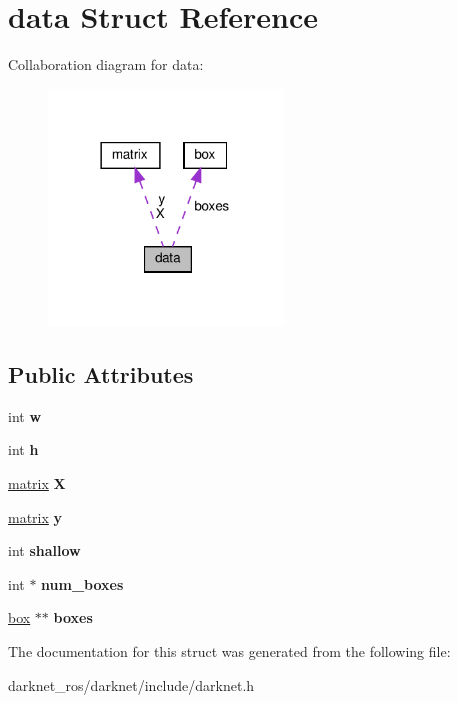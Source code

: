 \hypertarget{structdata}{}\section{data Struct Reference}
\label{structdata}


Collaboration diagram for data\+:
\nopagebreak
\begin{figure}[H]
\begin{center}
\leavevmode
\includegraphics[width=177pt]{structdata__coll__graph}
\end{center}
\end{figure}
\subsection*{Public Attributes}
\begin{DoxyCompactItemize}
\item 
\mbox{\label{structdata_a9de96028e1598b323d91ffb059cd48b2}} 
int {\bfseries w}
\item 
\mbox{\label{structdata_adbac4a041922ac9e6c47953f5fa23126}} 
int {\bfseries h}
\item 
\mbox{\label{structdata_a1f37ae26b26b12ef5c70a12957826e87}} 
\hyperlink{structmatrix}{matrix} {\bfseries X}
\item 
\mbox{\label{structdata_a30946bde3a05e40df6fbb49c5dd9b627}} 
\hyperlink{structmatrix}{matrix} {\bfseries y}
\item 
\mbox{\label{structdata_a3ef4c4e942b1f2b6a5e64e7fb7e12491}} 
int {\bfseries shallow}
\item 
\mbox{\label{structdata_afba4d3b06050db7a30b0b11809ae6e23}} 
int $\ast$ {\bfseries num\+\_\+boxes}
\item 
\mbox{\label{structdata_a8379df4ef55945c6fdb778dd581dce55}} 
\hyperlink{structbox}{box} $\ast$$\ast$ {\bfseries boxes}
\end{DoxyCompactItemize}


The documentation for this struct was generated from the following file\+:\begin{DoxyCompactItemize}
\item 
darknet\+\_\+ros/darknet/include/darknet.\+h\end{DoxyCompactItemize}
